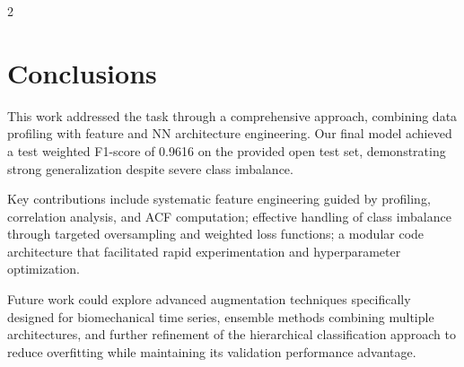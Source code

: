 \documentclass[11pt]{article}
\begin{document}
\begin{multicols}{2}
        \section{Conclusions}
        This work addressed the task through a comprehensive approach, combining data profiling with feature and NN architecture engineering. Our final model achieved a test weighted F1-score of 0.9616 on the provided open test set, demonstrating strong generalization despite severe class imbalance.

        Key contributions include systematic feature engineering guided by profiling, correlation analysis, and ACF computation; effective handling of class imbalance through targeted oversampling and weighted loss functions; a modular code architecture that facilitated rapid experimentation and hyperparameter optimization.
        
        Future work could explore advanced augmentation techniques specifically designed for biomechanical time series, ensemble methods combining multiple architectures, and further refinement of the hierarchical classification approach to reduce overfitting while maintaining its validation performance advantage.
        
    
        
    \end{multicols}
    
    
        
\end{document}
